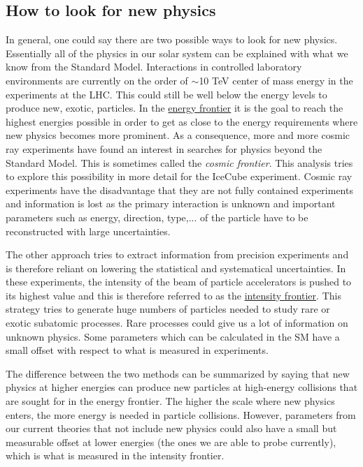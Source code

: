 \subsection{How to look for new physics}
In general, one could say there are two possible ways to look for new physics. Essentially all of the physics in our solar system can be explained with what we know from the Standard Model. Interactions in controlled laboratory environments are currently on the order of $\sim$10 TeV center of mass energy in the experiments at the LHC. This could still be well below the energy levels to produce new, exotic, particles. In the \underline{energy frontier} it is the goal to reach the highest energies possible in order to get as close to the energy requirements where new physics becomes more prominent. As a consequence, more and more cosmic ray experiments have found an interest in searches for physics beyond the Standard Model. This is sometimes called the \textit{cosmic frontier}. This analysis tries to explore this possibility in more detail for the IceCube experiment. Cosmic ray experiments have the disadvantage that they are not fully contained experiments and information is lost as the primary interaction is unknown and important parameters such as energy, direction, type,... of the particle have to be reconstructed with large uncertainties.

The other approach tries to extract information from precision experiments and is therefore reliant on lowering the statistical and systematical uncertainties. In these experiments, the intensity of the beam of particle accelerators is pushed to its highest value and this is therefore referred to as the \underline{intensity frontier}. This strategy tries to generate huge numbers of particles needed to study rare or exotic subatomic processes. Rare processes could give us a lot of information on unknown physics. Some parameters which can be calculated in the SM have a small offset with respect to what is measured in experiments.

The difference between the two methods can be summarized by saying that new physics at higher energies can produce new particles at high-energy collisions that are sought for in the energy frontier. The higher the scale where new physics enters, the more energy is needed in particle collisions. However, parameters from our current theories that not include new physics could also have a small but measurable offset at lower energies (the ones we are able to probe currently), which is what is measured in the intensity frontier. \\


